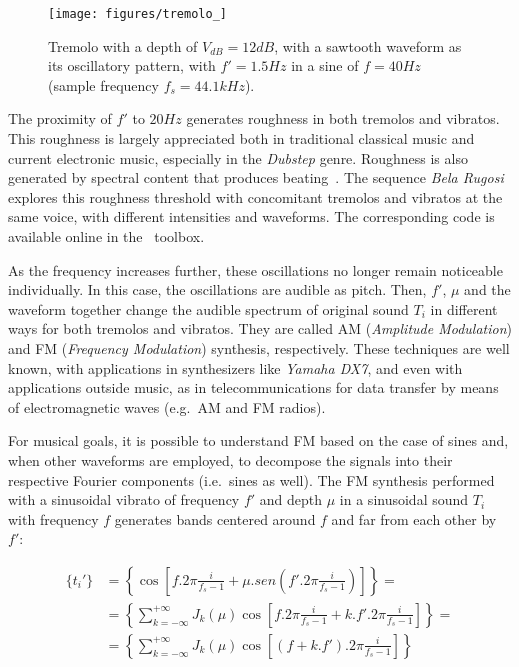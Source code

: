 \begin{figure}
     \centering
         \texttt{[image: figures/tremolo\_]}
     \caption{Tremolo with a depth of $V_{dB}=12dB$, with a sawtooth waveform as its oscillatory pattern, with $f'=1.5Hz$ in a sine of $f=40Hz$ (sample frequency $f_s=44.1kHz$).}
         \label{fig:tremolo}
\end{figure}

The proximity of $f'$ to $20Hz$ generates roughness in both tremolos and vibratos. This roughness is largely appreciated both in traditional classical music and current electronic music, especially in the \emph{Dubstep} genre. Roughness is also generated by spectral content that produces beating~\cite{Porres,porres2009}. The sequence \emph{Bela Rugosi} explores this roughness threshold with concomitant tremolos and vibratos at the same voice, with different intensities and waveforms. The corresponding code is available online in the \massa\ toolbox.

As the frequency increases further, these oscillations no longer remain noticeable individually. In this case, the oscillations are audible as pitch. Then, $f'$, $\mu$ and the waveform together change the audible spectrum of original sound $T_i$ in different ways for both tremolos and vibratos. They are called AM (\emph{Amplitude Modulation}) and FM (\emph{Frequency Modulation}) synthesis,
respectively. These techniques are well known, with applications in
synthesizers like \emph{Yamaha DX7}, and even with applications outside music, as in telecommunications for data transfer by means of electromagnetic waves (e.g.\ AM and FM radios).

For musical goals, it is possible to understand FM based on the
case of sines and, when other waveforms are employed, to decompose the signals into their respective Fourier components (i.e.\ sines as well). The FM synthesis performed with a sinusoidal vibrato of frequency $f'$ and depth $\mu$ in a sinusoidal sound $T_i$ with frequency $f$ generates bands centered around $f$ and far from each other by $f'$:

\begin{equation}\label{eq:fmEsp}
\begin{split}
\{t_i'\} & = \left \{ \cos \left [f . 2 \pi \frac{i}{f_s-1} + \mu . sen \left ( f' . 2 \pi \frac{i}{ f_s -1 } \right ) \right ] \right \} = \\
 & = \left \{ \sum_{k=-\infty}^{+\infty} J_k(\mu) \cos \left [ f . 2 \pi \frac{i}{f_s-1} + k . f' . 2 \pi \frac{i}{f_s-1} \right ]  \right \} = \\
 & = \left \{ \sum_{k=-\infty}^{+\infty} J_k(\mu) \cos \left [ (f+k.f') . 2 \pi \frac{i}{f_s-1} \right ]  \right \}
\end{split}
\end{equation}

